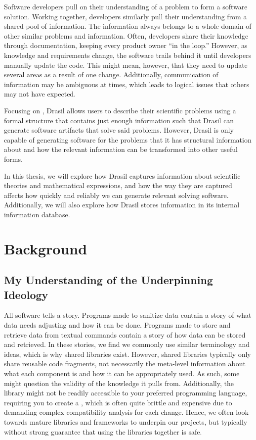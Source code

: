 Software developers pull on their understanding of a problem to form a software
solution. Working together, developers similarly pull their understanding from a
shared pool of information. The information always belongs to a whole domain of
other similar problems and information. Often, developers share their knowledge
through documentation, keeping every product owner ``in the loop.'' However, as
knowledge and requirements change, the software trails behind it until
developers manually update the code. This might mean, however, that they need to
update several areas as a result of one change. Additionally, communication of
information may be ambiguous at times, which leads to logical issues that others
may not have expected.

Focusing on , Drasil allows users to describe their scientific problems
using a formal  structure that contains just enough information such
that Drasil can generate software artifacts that solve said problems. However,
Drasil is only capable of generating software for the problems that it has
structural information about and how the relevant information can be transformed
into other useful forms.

In this thesis, we will explore how Drasil captures information about scientific
theories and mathematical expressions, and how the way they are captured affects
how quickly and reliably we can generate relevant solving software.
Additionally, we will also explore how Drasil stores information in its internal
information database.

\section{Background}
\label{sec:intro:background}

\subsection{My Understanding of the Underpinning Ideology}

All software tells a story. Programs made to sanitize data contain a story of
what data needs adjusting and how it can be done. Programs made to store and
retrieve data from textual commands contain a story of how data can be stored
and retrieved. In these stories, we find we commonly use similar terminology and
ideas, which is why shared libraries exist. However, shared libraries typically
only share reusable code fragments, not necessarily the meta-level information
about what each component is and how it can be appropriately used. As such, some
might question the validity of the knowledge it pulls from. Additionally, the
library might not be readily accessible to your preferred programming language,
requiring you to create a , which is often quite brittle and expensive
due to demanding complex compatibility analysis for each change. Hence, we often
look towards mature libraries and frameworks to underpin our projects, but
typically without strong guarantee that using the libraries together is safe. 

